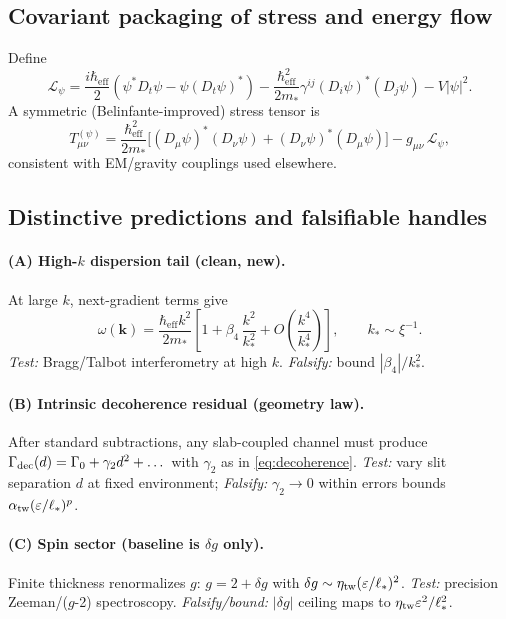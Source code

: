 \subsection{Covariant packaging of stress and energy flow}
\label{sec:QM_covariant}

Define
\[
\mathcal{L}_{\psi} = \frac{i\hbar_{\mathrm{eff}}}{2}(\psi^* D_t\psi - \psi (D_t\psi)^*) - \frac{\hbar_{\mathrm{eff}}^2}{2m_*}\gamma^{ij}(D_i\psi)^*(D_j\psi) - V|\psi|^2 .
\]
A symmetric (Belinfante-improved) stress tensor is
\begin{equation}
T_{\mu\nu}^{(\psi)} = \frac{\hbar_{\mathrm{eff}}^2}{2m_*}\Big[(D_\mu\psi)^* (D_\nu\psi) + (D_\nu\psi)^*(D_\mu\psi)\Big] - g_{\mu\nu}\,\mathcal{L}_{\psi},
\label{eq:stress}
\end{equation}
consistent with EM/gravity couplings used elsewhere.

\subsection{Distinctive predictions and falsifiable handles}
\label{sec:QM_tests}

\paragraph{(A) High-$k$ dispersion tail (clean, new).}
At large \(k\), next-gradient terms give
\begin{equation}
\omega(\mathbf k) = \frac{\hbar_{\mathrm{eff}} k^2}{2m_*}\left[1 + \beta_4\,\frac{k^2}{k_*^2} + O\!\left(\frac{k^4}{k_*^4}\right)\right], \qquad k_* \sim \xi^{-1}.
\label{eq:dispersion}
\end{equation}
\emph{Test:} Bragg/Talbot interferometry at high \(k\). \emph{Falsify:} bound \(|\beta_4|/k_*^2\).

\paragraph{(B) Intrinsic decoherence residual (geometry law).}
After standard subtractions, any slab-coupled channel must produce \(\Gamma_{\rm dec}(d)=\Gamma_0+\gamma_2 d^2+\dots\) with \(\gamma_2\) as in \eqref{eq:decoherence}. \emph{Test:} vary slit separation \(d\) at fixed environment; \emph{Falsify:} \(\gamma_2\to 0\) within errors bounds \(\alpha_{\rm tw}(\varepsilon/\ell_*)^p\).

\paragraph{(C) Spin sector (baseline is $\delta g$ only).}
Finite thickness renormalizes \(g\): \(g=2+\delta g\) with \(\delta g \sim \eta_{\rm tw}(\varepsilon/\ell_*)^2\). \emph{Test:} precision Zeeman/($g$-2) spectroscopy. \emph{Falsify/bound:} \(|\delta g|\) ceiling maps to \(\eta_{\rm tw}\varepsilon^2/\ell_*^2\).

